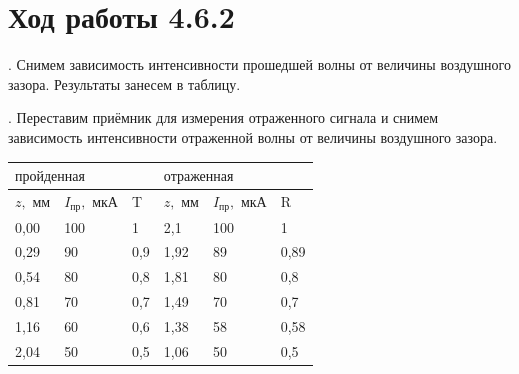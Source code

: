 \documentclass[a4paper,12pt]{article} %
\begin{document}
\newpage

\section{Ход работы 4.6.2}

. Снимем зависимость интенсивности прошедшей волны от величины воздушного зазора. Результаты занесем в таблицу.\\
\medskip

. Переставим приёмник для измерения отраженного сигнала и снимем зависимость интенсивности отраженной волны от величины воздушного зазора.\\

\begin{table}[h!]
\begin{tabular}{|lll|lll|}
\hline
\multicolumn{3}{|l|}{$\text{пройденная}$}                                                        & \multicolumn{3}{l|}{$\text{отраженная}$}                                                      \\ \hline
\multicolumn{1}{|l|}{$z, \text{ мм}$} & \multicolumn{1}{l|}{$I_\text{пр},   \text{ мкА}$} & T    & \multicolumn{1}{l|}{$z, \text{ мм}$} & \multicolumn{1}{l|}{$I_\text{пр}, \text{ мкА}$} & R    \\ \hline
\multicolumn{1}{|l|}{0,00}            & \multicolumn{1}{l|}{100}                          & 1    & \multicolumn{1}{l|}{2,1}             & \multicolumn{1}{l|}{100}                        & 1    \\ \hline
\multicolumn{1}{|l|}{0,29}            & \multicolumn{1}{l|}{90}                           & 0,9  & \multicolumn{1}{l|}{1,92}            & \multicolumn{1}{l|}{89}                         & 0,89 \\ \hline
\multicolumn{1}{|l|}{0,54}            & \multicolumn{1}{l|}{80}                           & 0,8  & \multicolumn{1}{l|}{1,81}            & \multicolumn{1}{l|}{80}                         & 0,8  \\ \hline
\multicolumn{1}{|l|}{0,81}            & \multicolumn{1}{l|}{70}                           & 0,7  & \multicolumn{1}{l|}{1,49}            & \multicolumn{1}{l|}{70}                         & 0,7  \\ \hline
\multicolumn{1}{|l|}{1,16}            & \multicolumn{1}{l|}{60}                           & 0,6  & \multicolumn{1}{l|}{1,38}            & \multicolumn{1}{l|}{58}                         & 0,58 \\ \hline
\multicolumn{1}{|l|}{2,04}            & \multicolumn{1}{l|}{50}                           & 0,5  & \multicolumn{1}{l|}{1,06}            & \multicolumn{1}{l|}{50}                         & 0,5  \\ \hline

\end{tabular}
\end{table}
\end{document}
